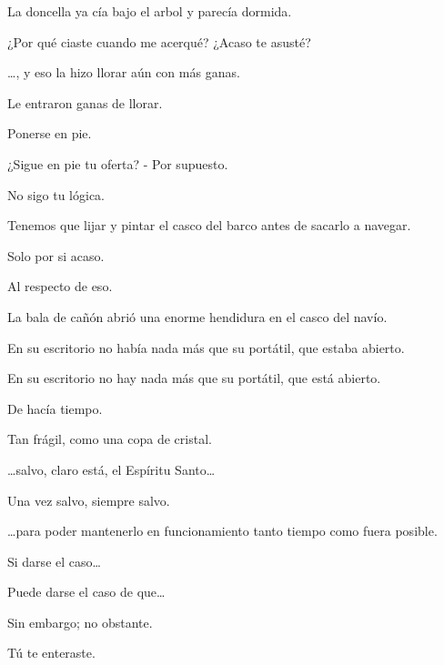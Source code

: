 \sk
La doncella ya cía bajo el arbol y parecía dormida. 

\sk
¿Por qué ciaste cuando me acerqué? ¿Acaso te asusté? 

\sk
\ldots{}, y eso la hizo llorar aún con más ganas. 

\sk
Le entraron ganas de llorar. 

\sk
Ponerse en pie. 

\sk
¿Sigue en pie tu oferta? - Por supuesto. 

\sk
No sigo tu lógica. 

\sk
Tenemos que lijar y pintar el casco del barco antes de sacarlo a navegar. 

\sk
Solo por si acaso. 

\sk
Al respecto de eso. 

\sk
La bala de cañón abrió una enorme hendidura en el casco del navío. 

\sk
En su escritorio no había nada más que su portátil, que estaba abierto. 

\sk
En su escritorio no hay nada más que su portátil, que está abierto.\nb{}

\sk
De hacía tiempo. 

\sk
Tan frágil, como una copa de cristal.\nb{}

\sk
\ldots{}salvo, claro está, el Espíritu Santo\ldots{}\nb{}

\sk
Una vez salvo, siempre salvo. 

\sk
\ldots{}para poder mantenerlo en funcionamiento tanto tiempo como fuera posible. 

\sk
Si darse el caso\ldots{} 

\sk
Puede darse el caso de que\ldots{} 

\sk
Sin embargo; no obstante. 

\sk
Tú te enteraste. 

